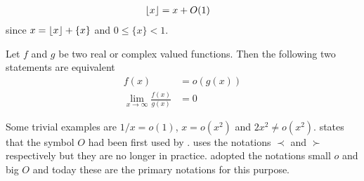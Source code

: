 \documentclass[elemannt.tex]{subfile}
\begin{document}
		\begin{align*}
			\floor{x}
				& = x+O(1)
		\end{align*}
	since $x=\floor{x}+\{x\}$ and $0\leq \{x\}<1$.
		\begin{definition}[Small O]
			Let $f$ and $g$ be two real or complex valued functions. Then the following two statements are equivalent
				\begin{align}
					f(x)
						& = o(g(x))\\
					\lim\limits_{x\to\infty}\frac{f(x)}{g(x)}
						& = 0
				\end{align}
		\end{definition}
	Some trivial examples are $1/x=o(1)$, $x=o(x^{2})$ and $2x^{2}\neq o(x^{2})$.  \textcite[Page 883 (second volume is paged consecutively after first volume)]{landau_1909} states that the symbol $O$ had been first used by \textcite[Page 401]{bachmann_1894}. \textcite{hardy_1910} uses the notations $\prec$ and $\succ$ respectively but they are no longer in practice. \textcite{hardy_riesz_1915} adopted the notations small $o$ and big $O$ and today these are the primary notations for this purpose.
\end{document}
